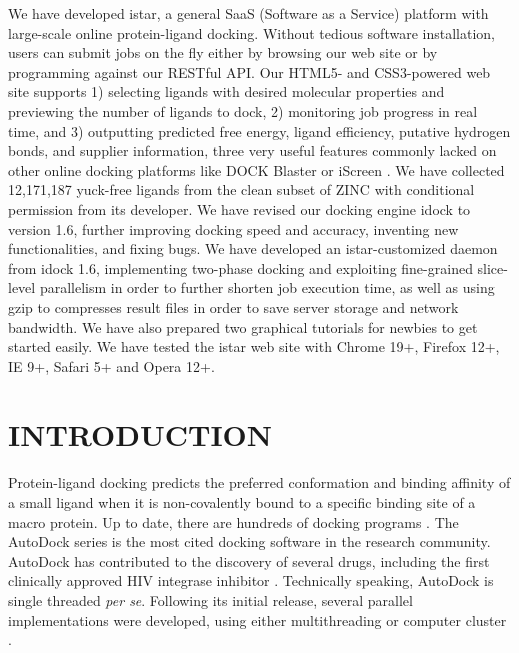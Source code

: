 \documentclass[12pt]{article}
\begin{document}
We have developed istar, a general SaaS (Software as a Service) platform with large-scale online protein-ligand docking. Without tedious software installation, users can submit jobs on the fly either by browsing our web site or by programming against our RESTful API. Our HTML5- and CSS3-powered web site supports 1) selecting ligands with desired molecular properties and previewing the number of ligands to dock, 2) monitoring job progress in real time, and 3) outputting predicted free energy, ligand efficiency, putative hydrogen bonds, and supplier information, three very useful features commonly lacked on other online docking platforms like DOCK Blaster \citep{557} or iScreen \citep{899}. We have collected 12,171,187 yuck-free ligands from the clean subset of ZINC \citep{532,1178} with conditional permission from its developer. We have revised our docking engine idock to version 1.6, further improving docking speed and accuracy, inventing new functionalities, and fixing bugs. We have developed an istar-customized daemon from idock 1.6, implementing two-phase docking and exploiting fine-grained slice-level parallelism in order to further shorten job execution time, as well as using gzip to compresses result files in order to save server storage and network bandwidth. We have also prepared two graphical tutorials for newbies to get started easily. We have tested the istar web site with Chrome 19+, Firefox 12+, IE 9+, Safari 5+ and Opera 12+.

\section*{\sffamily \Large INTRODUCTION} %

Protein-ligand docking predicts the preferred conformation and binding affinity of a small ligand when it is non-covalently bound to a specific binding site of a macro protein. Up to date, there are hundreds of docking programs \citep{493,922}. The AutoDock series is the most cited docking software in the research community. AutoDock has contributed to the discovery of several drugs, including the first clinically approved HIV integrase inhibitor \citep{1169}. Technically speaking, AutoDock is single threaded \textit{per se}. Following its initial release, several parallel implementations were developed, using either multithreading or computer cluster \citep{115,560,782}.
\end{document}
